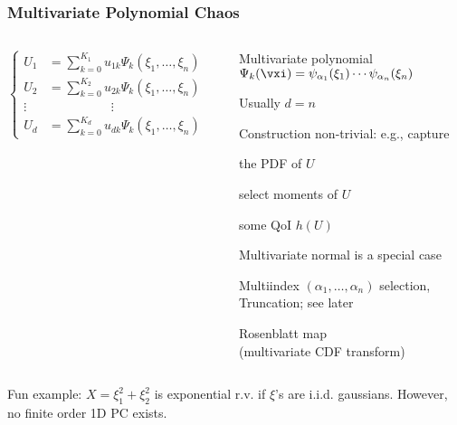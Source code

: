 \begin{frame}[t] \label{pcuq3}
  \frametitle{Multivariate Polynomial Chaos}
  
  \begin{columns}[totalwidth=\textwidth]
  \begin{column}{0.5\textwidth}
$\left\{\begin{aligned}
U_1&=\sum_{k=0}^{K_1} u_{1k}\Psi_k(\xi_1,\dots,\xi_n)\\
U_2&=\sum_{k=0}^{K_2} u_{2k}\Psi_k(\xi_1,\dots,\xi_n)\\
\vdots &\quad \qquad\qquad \vdots \\
U_d&=\sum_{k=0}^{K_d} u_{dk}\Psi_k(\xi_1,\dots,\xi_n)
\end{aligned}\right.
$
  \end{column}
  \begin{column}{0.85\textwidth}
   \begin{center}
   \footnotesize
\bi
\item Multivariate polynomial \\ $\Psi_k(\vxi)=\psi_{\alpha_1}(\xi_1)\cdots \psi_{\alpha_n}(\xi_n)$
\item Usually $d=n$
\item Construction non-trivial: e.g., capture 
\hspace*{0.5cm}
\bi
\item \begin{scriptsize} the PDF of $U$ \end{scriptsize}
\item \begin{scriptsize} select moments of $U$ \end{scriptsize}
\item \begin{scriptsize} some QoI $h(U)$ \end{scriptsize}
\ei
\item Multivariate normal is a special case
\item Multiindex $(\alpha_1,\dots,\alpha_n)$ selection, \\ Truncation;  see later
\item Rosenblatt map \\(multivariate CDF transform)
\ei  
     \end{center}
  \end{column}
\end{columns}

\bigskip
{}
{
Fun example: $X=\xi_1^2+\xi_2^2$ is exponential r.v. if $\xi$'s are i.i.d. gaussians. However, no finite order 1D PC exists.
}

 
 \end{frame}

